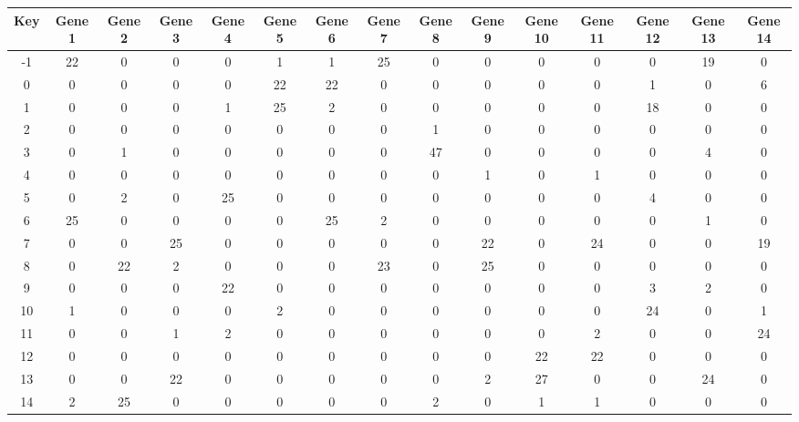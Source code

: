 \begin{tabular}{|c|c|c|c|c|c|c|c|c|c|c|c|c|c|c|}
\hline
Key & Gene 1 & Gene 2 & Gene 3 & Gene 4 & Gene 5 & Gene 6 & Gene 7 & Gene 8 & Gene 9 & Gene 10 & Gene 11 & Gene 12 & Gene 13 & Gene 14 \\
\hline
-1 & 22 & 0 & 0 & 0 & 1 & 1 & 25 & 0 & 0 & 0 & 0 & 0 & 19 & 0 \\
0 & 0 & 0 & 0 & 0 & 22 & 22 & 0 & 0 & 0 & 0 & 0 & 1 & 0 & 6 \\
1 & 0 & 0 & 0 & 1 & 25 & 2 & 0 & 0 & 0 & 0 & 0 & 18 & 0 & 0 \\
2 & 0 & 0 & 0 & 0 & 0 & 0 & 0 & 1 & 0 & 0 & 0 & 0 & 0 & 0 \\
3 & 0 & 1 & 0 & 0 & 0 & 0 & 0 & 47 & 0 & 0 & 0 & 0 & 4 & 0 \\
4 & 0 & 0 & 0 & 0 & 0 & 0 & 0 & 0 & 1 & 0 & 1 & 0 & 0 & 0 \\
5 & 0 & 2 & 0 & 25 & 0 & 0 & 0 & 0 & 0 & 0 & 0 & 4 & 0 & 0 \\
6 & 25 & 0 & 0 & 0 & 0 & 25 & 2 & 0 & 0 & 0 & 0 & 0 & 1 & 0 \\
7 & 0 & 0 & 25 & 0 & 0 & 0 & 0 & 0 & 22 & 0 & 24 & 0 & 0 & 19 \\
8 & 0 & 22 & 2 & 0 & 0 & 0 & 23 & 0 & 25 & 0 & 0 & 0 & 0 & 0 \\
9 & 0 & 0 & 0 & 22 & 0 & 0 & 0 & 0 & 0 & 0 & 0 & 3 & 2 & 0 \\
10 & 1 & 0 & 0 & 0 & 2 & 0 & 0 & 0 & 0 & 0 & 0 & 24 & 0 & 1 \\
11 & 0 & 0 & 1 & 2 & 0 & 0 & 0 & 0 & 0 & 0 & 2 & 0 & 0 & 24 \\
12 & 0 & 0 & 0 & 0 & 0 & 0 & 0 & 0 & 0 & 22 & 22 & 0 & 0 & 0 \\
13 & 0 & 0 & 22 & 0 & 0 & 0 & 0 & 0 & 2 & 27 & 0 & 0 & 24 & 0 \\
14 & 2 & 25 & 0 & 0 & 0 & 0 & 0 & 2 & 0 & 1 & 1 & 0 & 0 & 0 \\
\hline
\end{tabular}